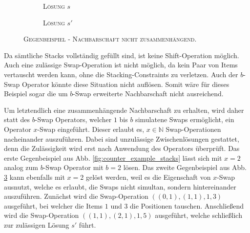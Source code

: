 \begin{figure}[H]
  \begin{subfigure}[b]{0.5\textwidth}
  \centering
    \caption{\textsc{Lösung $s$}}
    \label{fig:c_2_a}
  \end{subfigure}
  \hfill
  \begin{subfigure}[b]{0.5\textwidth}
  \centering
    \caption{\textsc{Lösung $s'$}}
    \label{fig:c_2_b}
  \end{subfigure}
  \caption{\textsc{Gegenbeispiel - Nachbarschaft nicht zusammenhängend.}}
  \label{fig:c_2_stacks}
\end{figure}

Da sämtliche Stacks vollständig gefüllt sind, ist keine Shift-Operation möglich.
Auch eine zulässige Swap-Operation ist nicht möglich, da kein Paar von Items vertauscht werden kann, ohne die
Stacking-Constraints zu verletzen. Auch der $b$-Swap Operator könnte diese Situation nicht auflösen.
Somit wäre für dieses Beispiel sogar die um $b$-Swap erweiterte Nachbarschaft nicht ausreichend.

\vfill
\pagebreak

Um letztendlich eine zusammenhängende Nachbarschaft zu erhalten, wird daher statt des $b$-Swap Operators,
welcher $1$ bis $b$ simulatene Swaps ermöglicht, ein Operator $x$-Swap eingeführt. Dieser erlaubt es, $x \in \mathbb{N}$
Swap-Operationen nacheinander auszuführen. Dabei sind unzulässige Zwischenlösungen gestattet, denn die Zulässigkeit
wird erst nach Anwendung des Operators überprüft. Das erste Gegenbeispiel aus Abb. \ref{fig:counter_example_stacks}
lässt sich mit $x = 2$ analog zum $b$-Swap Operator mit $b = 2$ lösen.
Das zweite Gegenbeispiel aus Abb. \ref{fig:c_2_stacks} kann ebenfalls mit $x = 2$ gelöst werden,
weil es die Eigenschaft von $x$-Swap ausnutzt, welche es erlaubt, die Swaps nicht simultan, sondern hintereinander
auszuführen. Zunächst wird die Swap-Operation $((0, 1), (1, 1), 1, 3)$ ausgeführt, bei welcher die Items $1$ und $3$
die Positionen tauschen. Anschließend wird die Swap-Operation $((1, 1), (2, 1), 1, 5)$ ausgeführt,
welche schließlich zur zulässigen Lösung $s'$ führt.

